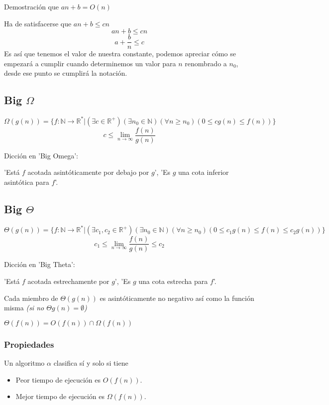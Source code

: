 \begin{example}
	Demostración que $an+b=O(n)$

	Ha de satisfacerse que $an+b\le cn$
	$$
		an+b\le cn      $$$$
		a+\frac bn\le c
	$$
	Es así que tenemos el valor de nuestra constante, podemos apreciar cómo se empezará a cumplir cuando determinemos un valor para $n$ renombrado a $n_0$, desde ese punto se cumplirá la notación.
\end{example}


\subsection{Big $\Omega$}
\begin{definition}$$
		\Omega(g(n)) =\{ f: \mathbb N \to \mathbb R^*  | (\exists c\in \mathbb R^+) (\exists n_0\in \mathbb N) (\forall n\ge n_0) ( 0\le cg(n) \le   f(n) ) \}
	$$$$
		c\le\lim_{n\to\infty}\frac{f(n)}{g(n)}
	$$\end{definition}


\begin{remark}Dicción en 'Big Omega':

	'Está $f$ acotada asintóticamente por debajo por $g$', 'Es $g$ una cota inferior asintótica para $f$'.
\end{remark}


\subsection{Big $\Theta$}
\begin{definition}
	$$
		\Theta   (g(n)) =\{ f : \mathbb N \to \mathbb R^* | (\exists c_1, c_2 \in \mathbb R^+) ( \exists n_0\in \mathbb N) (\forall n \ge n_0) (0\le c_1 g(n) \le f(n) \le c_2 g(n)) \}
	$$$$
		c_1\le\lim_{n\to\infty}\frac{f(n)}{g(n)}\le c_2
	$$\end{definition}

\begin{remark}Dicción en 'Big Theta':

	'Está $f$ acotada estrechamente por $g$', 'Es $g$ una cota estrecha para $f$'.
\end{remark}
Cada miembro de $\Theta(g(n))$ es asintóticamente no negativo así como la función misma \textit{(si no $\Theta{g(n)}=\emptyset$)}

\begin{theorem}
	$\Theta(f(n)) =O(f(n))\cap \Omega(f(n))$
\end{theorem}

\subsubsection{Propiedades}
Un algoritmo $\alpha$ clasifica sí y solo si tiene
\begin{itemize}
	\item Peor tiempo de ejecución es $O(f(n)).$
	\item Mejor tiempo de ejecución es $\Omega(f(n)).$
\end{itemize}

